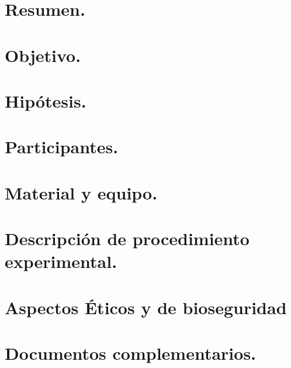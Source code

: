 \documentclass[12pt]{article}
\begin{document}
\section{Resumen.}
\section{Objetivo.}
\section{Hipótesis.}
\section{Participantes.}
\section{Material y equipo.}
\section{Descripción de procedimiento experimental.}
\section{Aspectos Éticos y de bioseguridad}
\section{Documentos complementarios.}
\end{document}
